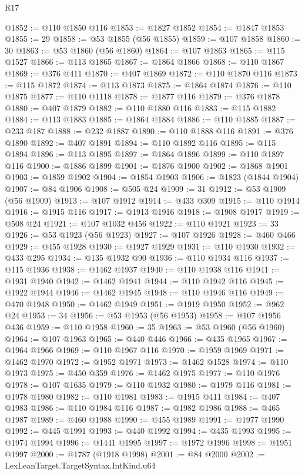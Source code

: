\begin{lexlean}{R17}
\begin{coremodule}
@1852 := @110 @1850 @116
@1853 := @1827 @1852
@1854 := @1847 @1853
@1855 := 29
@1858 := @53 @1855 (@56 @1855)
@1859 := @107 @1858
@1860 := 30
@1863 := @53 @1860 (@56 @1860)
@1864 := @107 @1863
@1865 := @115 @1527
@1866 := @113 @1865
@1867 := @1864 @1866
@1868 := @110 @1867
@1869 := @376 @411
@1870 := @407 @1869
@1872 := @110 @1870 @116
@1873 := @115 @1872
@1874 := @113 @1873
@1875 := @1864 @1874
@1876 := @110 @1875
@1877 := @110 @1118
@1878 := @1877 @116
@1879 := @376 @1878
@1880 := @407 @1879
@1882 := @110 @1880 @116
@1883 := @115 @1882
@1884 := @113 @1883
@1885 := @1864 @1884
@1886 := @110 @1885
@1887 := @233 @187
@1888 := @232 @1887
@1890 := @110 @1888 @116
@1891 := @376 @1890
@1892 := @407 @1891
@1894 := @110 @1892 @116
@1895 := @115 @1894
@1896 := @113 @1895
@1897 := @1864 @1896
@1899 := @110 @1897 @116
@1900 := @1886 @1899
@1901 := @1876 @1900
@1902 := @1868 @1901
@1903 := @1859 @1902
@1904 := @1854 @1903
@1906 := @1823 (@1844 @1904)
@1907 := @84 @1906
@1908 := @505 @24
@1909 := 31
@1912 := @53 @1909 (@56 @1909)
@1913 := @107 @1912
@1914 := @433 @309
@1915 := @110 @1914
@1916 := @1915 @116
@1917 := @1913 @1916
@1918 := @1908 @1917
@1919 := @508 @24
@1921 := @107 @1032 @456
@1922 := @110 @1921
@1923 := 33
@1926 := @53 @1923 (@56 @1923)
@1927 := @107 @1926
@1928 := @460 @466
@1929 := @455 @1928
@1930 := @1927 @1929
@1931 := @110 @1930
@1932 := @433 @295
@1934 := @135 @1932 @90
@1936 := @110 @1934 @116
@1937 := @115 @1936
@1938 := @1462 @1937
@1940 := @110 @1938 @116
@1941 := @1931 @1940
@1942 := @1462 @1941
@1944 := @110 @1942 @116
@1945 := @1922 @1944
@1946 := @1462 @1945
@1948 := @110 @1946 @116
@1949 := @470 @1948
@1950 := @1462 @1949
@1951 := @1919 @1950
@1952 := @962 @24
@1953 := 34
@1956 := @53 @1953 (@56 @1953)
@1958 := @107 @1956 @436
@1959 := @110 @1958
@1960 := 35
@1963 := @53 @1960 (@56 @1960)
@1964 := @107 @1963
@1965 := @440 @446
@1966 := @435 @1965
@1967 := @1964 @1966
@1969 := @110 @1967 @116
@1970 := @1959 @1969
@1971 := @1462 @1970
@1972 := @1952 @1971
@1973 := @1462 @1528
@1974 := @110 @1973
@1975 := @450 @359
@1976 := @1462 @1975
@1977 := @110 @1976
@1978 := @107 @1635
@1979 := @110 @1932
@1980 := @1979 @116
@1981 := @1978 @1980
@1982 := @110 @1981
@1983 := @1915 @411
@1984 := @407 @1983
@1986 := @110 @1984 @116
@1987 := @1982 @1986
@1988 := @465 @1987
@1989 := @460 @1988
@1990 := @455 @1989
@1991 := @1977 @1990
@1992 := @445 @1991
@1993 := @440 @1992
@1994 := @435 @1993
@1995 := @1974 @1994
@1996 := @1441 @1995
@1997 := @1972 @1996
@1998 := @1951 @1997
@2000 := @1787 (@1918 @1998)
@2001 := @84 @2000
@2002 := LexLeanTarget.TargetSyntax.IntKind.u64

\end{coremodule}
\end{lexlean}
